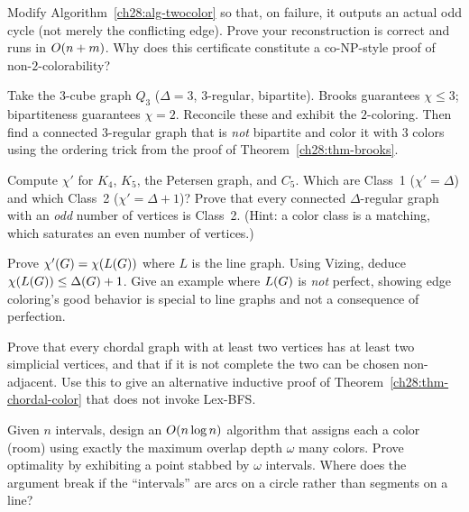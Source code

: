 \begin{exercise}
\label{ch28:ex-oddcycle}
Modify Algorithm~\ref{ch28:alg-twocolor} so that, on failure, it outputs an actual odd cycle
(not merely the conflicting edge). Prove your reconstruction is correct and runs in
$O(n+m)$. Why does this certificate constitute a co-NP-style proof of
non-$2$-colorability?
\end{exercise}

\begin{exercise}
\label{ch28:ex-brooks}
Take the $3$-cube graph $Q_3$ ($\Delta=3$, $3$-regular, bipartite). Brooks
guarantees $\chi\le 3$; bipartiteness guarantees $\chi=2$. Reconcile these and
exhibit the $2$-coloring. Then find a connected $3$-regular graph that is \emph{not}
bipartite and color it with $3$ colors using the ordering trick from the proof of
Theorem~\ref{ch28:thm-brooks}.
\end{exercise}

\begin{exercise}
\label{ch28:ex-vizing}
Compute $\chi'$ for $K_4$, $K_5$, the Petersen graph, and $C_5$. Which are Class~1
($\chi'=\Delta$) and which Class~2 ($\chi'=\Delta+1$)? Prove that every connected
$\Delta$-regular graph with an \emph{odd} number of vertices is Class~2. (Hint: a
color class is a matching, which saturates an even number of vertices.)
\end{exercise}

\begin{exercise}
\label{ch28:ex-linegraph}
Prove $\chi'(G)=\chi(L(G))$ where $L$ is the line graph. Using Vizing, deduce
$\chi(L(G))\le\Delta(G)+1$. Give an example where $L(G)$ is \emph{not}
perfect, showing edge coloring's good behavior is special to line graphs and not a
consequence of perfection.
\end{exercise}

\begin{exercise}
\label{ch28:ex-simplicial}
Prove that every chordal graph with at least two vertices has at least two
simplicial vertices, and that if it is not complete the two can be chosen
non-adjacent. Use this to give an alternative inductive proof of
Theorem~\ref{ch28:thm-chordal-color} that does not invoke Lex-BFS.
\end{exercise}

\begin{exercise}
\label{ch28:ex-interval}
Given $n$ intervals, design an $O(n\log n)$ algorithm that assigns each a color
(room) using exactly the maximum overlap depth $\omega$ many colors. Prove
optimality by exhibiting a point stabbed by $\omega$ intervals. Where does the
argument break if the ``intervals'' are arcs on a circle rather than segments on a
line?
\end{exercise}

